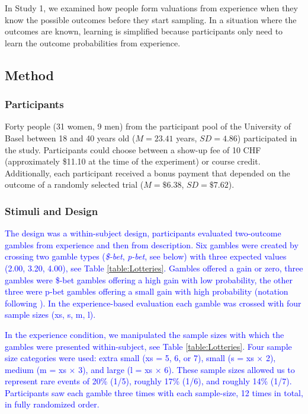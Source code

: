 \documentclass[a4paper, man, natbib, floatsintext]{apa6} %
\begin{document}
In Study 1, we examined how people form valuations from experience when they know the possible outcomes before they start sampling. In a situation where the outcomes are known, learning is simplified because participants only need to learn the outcome probabilities from experience. 

\subsection{Method}
\subsubsection{Participants}
Forty people (31 women, 9 men) from the participant pool of the University of Basel between 18 and 40 years old ($M = 23.41$ years, $SD = 4.86$) participated in the study. Participants could choose between a show-up fee of 10 CHF (approximately \$11.10 at the time of the experiment) or course credit. Additionally, each participant received a bonus payment that depended on the outcome of a randomly selected trial ($M = \$6.38$, $SD = \$7.62$).
\subsubsection{Stimuli and Design}
\textcolor{blue}{The design was a within-subject design, participants evaluated two-outcome gambles from experience and then from description. Six gambles were created by crossing two gamble types (\textit{\$-bet}, \textit{p-bet}, see below) with three expected values (2.00, 3.20, 4.00), see Table \ref{table:Lotteries}. Gambles offered a gain or zero, three gambles were \$-bet gambles offering a high gain with low probability, the other three were p-bet gambles offering a small gain with high probability (notation following \citealp{Lichtenstein1971}). In the experience-based evaluation each gamble was crossed with four sample sizes (xs, s, m, l). }

\textcolor{blue}{In the experience condition, we manipulated the sample sizes with which the gambles were presented within-subject, see Table \ref{table:Lotteries}. Four sample size categories were used: extra small (xs = 5, 6, or 7), small (s = xs $\times$ 2), medium (m = xs $\times$ 3), and large (l = xs $\times$ 6). These sample sizes allowed us to represent rare events of 20\% (1/5), roughly 17\% (1/6), and roughly 14\% (1/7). Participants saw each gamble three times with each sample-size, 12 times in total, in fully randomized order.} %
\end{document}
